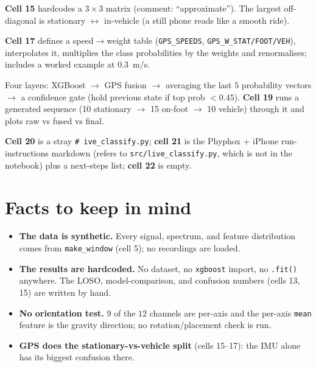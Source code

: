 \documentclass[11pt]{article}
\begin{document}
\begin{description}[leftmargin=0pt, style=nextline]
  \item[\textbf{Cells 14--15} --- confusion matrix (\S5)] \textbf{Cell 15} hardcodes a
        $3\times 3$ matrix (comment: ``approximate''). The largest off-diagonal is
        stationary $\leftrightarrow$ in-vehicle (a still phone reads like a smooth
        ride).

  \item[\textbf{Cells 16--17} --- GPS fusion (\S6)] \textbf{Cell 17} defines a
        speed$\to$weight table (\texttt{GPS\_SPEEDS}, \texttt{GPS\_W\_STAT/FOOT/VEH}),
        interpolates it, multiplies the class probabilities by the weights and
        renormalises; includes a worked example at $0.3$~m/s.

  \item[\textbf{Cells 18--19} --- inference pipeline (\S7)] Four layers: XGBoost
        $\to$ GPS fusion $\to$ averaging the last $5$ probability vectors $\to$ a
        confidence gate (hold previous state if top prob $<0.45$). \textbf{Cell 19}
        runs a generated sequence (10 stationary $\to$ 15 on-foot $\to$ 10 vehicle)
        through it and plots raw vs fused vs final.

  \item[\textbf{Cells 20--22} --- live / leftovers] \textbf{Cell 20} is a stray
        \texttt{\# ive\_classify.py}; \textbf{cell 21} is the Phyphox + iPhone
        run-instructions markdown (refers to \texttt{src/live\_classify.py}, which is
        not in the notebook) plus a next-steps list; \textbf{cell 22} is empty.
\end{description}

\section{Facts to keep in mind}
\begin{itemize}[noitemsep]
  \item \textbf{The data is synthetic.} Every signal, spectrum, and feature
        distribution comes from \texttt{make\_window} (cell 5); no recordings are
        loaded.
  \item \textbf{The results are hardcoded.} No dataset, no \texttt{xgboost} import, no
        \texttt{.fit()} anywhere. The LOSO, model-comparison, and confusion numbers
        (cells 13, 15) are written by hand.
  \item \textbf{No orientation test.} $9$ of the $12$ channels are per-axis and the
        per-axis \texttt{mean} feature is the gravity direction; no rotation/placement
        check is run.
  \item \textbf{GPS does the stationary-vs-vehicle split} (cells 15--17): the IMU
        alone has its biggest confusion there.
\end{itemize}
\end{document}
